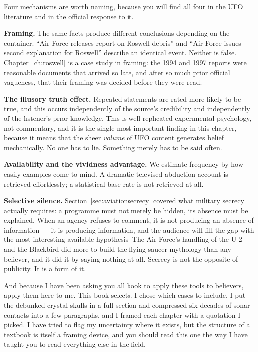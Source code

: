 Four mechanisms are worth naming, because you will find all four in the UFO literature and in the
official response to it.

\textbf{Framing.} The same facts produce different conclusions depending on the container. ``Air Force
releases report on Roswell debris'' and ``Air Force issues second explanation for Roswell'' describe
an identical event. Neither is false. Chapter~\ref{ch:roswell} is a case study in framing: the 1994 and
1997 reports were reasonable documents that arrived so late, and after so much prior official
vagueness, that their framing was decided before they were read.

\textbf{The illusory truth effect.} Repeated statements are rated more likely to be true, and this
occurs independently of the source's credibility and independently of the listener's prior knowledge.
This is well replicated experimental psychology, not commentary, and it is the single most important
finding in this chapter, because it means that the sheer \emph{volume} of UFO content generates
belief mechanically. No one has to lie. Something merely has to be said often.

\textbf{Availability and the vividness advantage.} We estimate frequency by how easily examples come to
mind. A dramatic televised abduction account is retrieved effortlessly; a statistical base rate is not
retrieved at all. 

\textbf{Selective silence.} Section~\ref{sec:aviationsecrecy} covered what military secrecy actually
requires: a programme must not merely be hidden, its absence must be explained. When an agency refuses
to comment, it is not producing an absence of information --- it is producing information, and the
audience will fill the gap with the most interesting available hypothesis. The Air Force's handling of
the U-2 and the Blackbird did more to build the flying-saucer mythology than any believer, and it did
it by saying nothing at all. Secrecy is not the opposite of publicity. It is a form of it.


And because I have been asking you all book to apply these tools to believers, apply them here to me.
This book selects. I chose which cases to include, I put the debunked crystal skulls in a full section
and compressed six decades of sonar contacts into a few paragraphs, and I framed each chapter with a
quotation I picked. I have tried to flag my uncertainty where it exists, but the structure of a
textbook is itself a framing device, and you should read this one the way I have taught you to read
everything else in the field.

